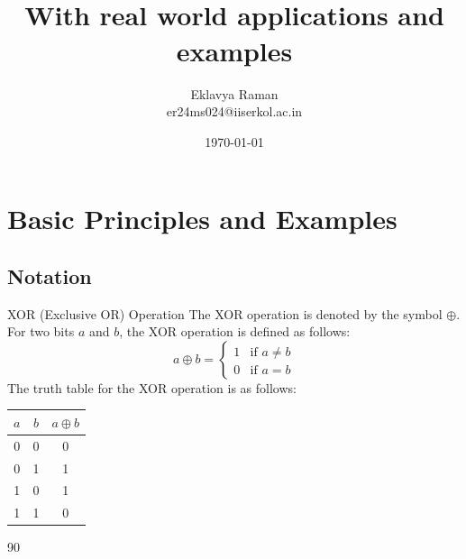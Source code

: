 \documentclass[openany]{book}
\begin{document}
\title{\Large{} \\ \vspace{5pt} 
\large{With real world applications and examples}}
\author{Eklavya Raman \\ \vspace{5pt} er24ms024@iiserkol.ac.in \\ \vspace{5pt}}
\date{\today}
\maketitle
\tableofcontents
\listoftheorems[
    show=mytheorem,
    title={List of Theorems}]
\chapter{Basic Principles and Examples}
\section{Notation}
\begin{mydefinition}{XOR (Exclusive OR) Operation}
The XOR operation is denoted by the symbol \( \oplus \). For two bits \( a \) and \( b \), the XOR operation is defined as follows:
\[ a \oplus b = \begin{cases} 
1 & \text{if } a \neq b \\
0 & \text{if } a = b
\end{cases} \]
The truth table for the XOR operation is as follows:
\begin{center}
\begin{tabular}{|c|c|c|}
\hline
\( a \) & \( b \) & \( a \oplus b \) \\
\hline
0 & 0 & 0 \\
0 & 1 & 1 \\
1 & 0 & 1 \\
1 & 1 & 0 \\
\hline
\end{tabular}
\end{center}
\end{mydefinition}90
\end{document}
